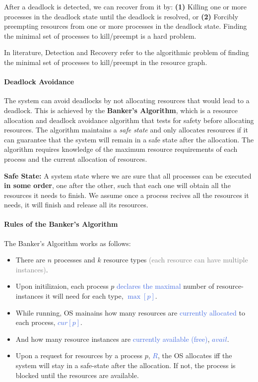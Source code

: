 \documentclass[openany,12pt]{book}
\newcommand{\blue}[1]{\textcolor{RoyalBlue}{#1}}
\newcommand{\gray}[1]{\textcolor{gray}{#1}}
\begin{document}
After a deadlock is detected, we can recover from it by: \textbf{(1)} Killing one or more processes in the deadlock state until the deadlock is resolved, or \textbf{(2)} Forcibly preempting resources from one or more processes in the deadlock state. Finding the minimal set of processes to kill/preempt is a hard problem.

In literature, Detection and Recovery refer to the algorithmic problem of finding the minimal set of processes to kill/preempt in the resource graph.

\paragraph{Deadlock Avoidance} The system can avoid deadlocks by not allocating resources that would lead to a deadlock. This is achieved by the \textbf{Banker's Algorithm}, which is a resource allocation and deadlock avoidance algorithm that tests for safety before allocating resources. The algorithm maintains a \textit{safe state} and only allocates resources if it can guarantee that the system will remain in a safe state after the allocation. The algorithm requires knowledge of the maximum resource requirements of each process and the current allocation of resources.

\textbf{Safe State:} A system state where we are sure that all processes can be executed \textbf{in some order}, one after the other, such that each one will obtain all the resources it needs to finish. We assume once a process recives all the resources it needs, it will finish and release all its resources. \par

\paragraph{Rules of the Banker's Algorithm} The Banker's Algorithm works as follows:
\begin{itemize}
    \item There are \(n\) processes and \(k\) resource types \gray{(each resource can have multiple instances)}.
    \item Upon initilizaion, each process \(p\) \blue{declares the maximal} number of resource-instances it will need for each type, \blue{\(\max[p]\)}.
    \item While running, OS mainains how many resources are \blue{currently allocated} to each process, \blue{\(cur[p]\)}.
    \item And how many resource instances are \blue{currently available (free)}, \blue{\(avail\)}.
    \item Upon a request for resources by a process \(p\), \blue{\(R\)}, the OS allocates iff the system will stay in a safe-state after the allocation. If not, the process is blocked until the resources are available.
\end{itemize}
\end{document}
